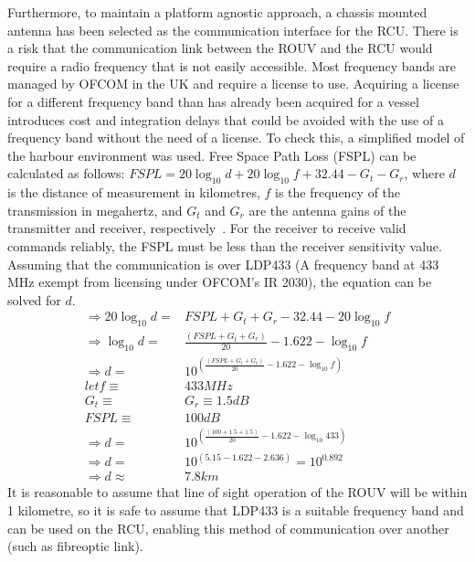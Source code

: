 \documentclass[../main.tex]{subfiles}
\begin{document}
Furthermore, to maintain a platform agnostic approach, a chassis mounted antenna has been selected as the communication interface for the RCU\@.
There is a risk that the communication link between the ROUV and the RCU would require a radio frequency that is not easily accessible.
Most frequency bands are managed by OFCOM in the UK and require a license to use.
Acquiring a license for a different frequency band than has already been acquired for a vessel introduces cost and integration delays that could be avoided with the use of a frequency band without the need of a license.
To check this, a simplified model of the harbour environment was used.
Free Space Path Loss (FSPL) can be calculated as follows:
$FSPL = 20 \log_{10}{d} + 20 \log_{10}{f} + 32.44 - G_{t} - G_{r}$, where $d$ is the distance of measurement in kilometres, $f$ is the frequency of the transmission in megahertz, and $G_{t}$ and $G_{r}$ are the antenna gains of the transmitter and receiver, respectively~\cite{IEEEAntennasandPropagationSociety2013}\cite{Kou2000}.
For the receiver to receive valid commands reliably, the FSPL must be less than the receiver sensitivity value.
Assuming that the communication is over LDP433 (A frequency band at 433 MHz exempt from licensing under OFCOM's IR 2030\cite{OFCOM2023}), the equation can be solved for $d$.
\begin{align*}
    \Rightarrow 20\log_{10}{d} =& FSPL + G_{t} + G_{r} - 32.44 - 20\log_{10}{f} \\
    \Rightarrow \log_{10}{d} =& \frac{\left(FSPL + G_{t} + G_{r}\right)}{20} - 1.622 - \log_{10}{f} \\
    \Rightarrow d =& 10^{\left(\frac{\left(FSPL + G_{t} + G_{r}\right)}{20} - 1.622 - \log_{10}{f}\right)} \\
    let f \equiv& 433 MHz \\
    G_{t} \equiv& G_{r} \equiv 1.5 dB \\ 
    FSPL \equiv& 100 dB \\
    \Rightarrow d =& 10 ^{\left(\frac{\left(100 + 1.5 + 1.5\right)}{20}-1.622-\log_{10}{433}\right)} \\
    \Rightarrow d =& 10 ^{\left(5.15 - 1.622 - 2.636\right)} = 10^{0.892} \\
    \Rightarrow d \approx& 7.8 km
\end{align*}
It is reasonable to assume that line of sight operation of the ROUV will be within 1 kilometre, so it is safe to assume that LDP433 is a suitable frequency band and can be used on the RCU, enabling this method of communication over another (such as fibreoptic link).
\end{document}
